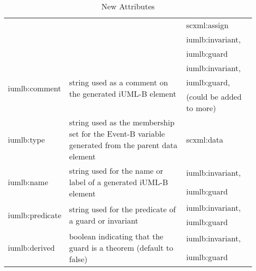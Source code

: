 \begin{table}[tbp]
{\begin{tabular}{|l|l|l|}
                                   &                                                                                                                            & scxml:assign             \\
                                   &                                                                                                                            & iumlb:invariant,         \\
                                   &                                                                                                                            & iumlb:guard              \\ \hline
\multirow{3}{*}{iumlb:comment}     & \multirow{3}{*}{string used as a comment on the generated iUML-B element}                                                  & iumlb:invariant,         \\
                                   &                                                                                                                            & iumlb:guard,             \\
                                   &                                                                                                                            & (could be added to more) \\ \hline
iumlb:type                         & string used as the membership set for the Event-B variable generated from the parent data element                          & scxml:data               \\ \hline
\multirow{2}{*}{iumlb:name}        & \multirow{2}{*}{string used for the name or label of a generated iUML-B element}                                           & iumlb:invariant,         \\
                                   &                                                                                                                            & iumlb:guard              \\ \hline
\multirow{2}{*}{iumlb:predicate}   & \multirow{2}{*}{string used for the predicate of a guard or invariant}                                                     & iumlb:invariant,         \\
                                   &                                                                                                                            & iumlb:guard              \\ \hline
\multirow{2}{*}{iumlb:derived}     & \multirow{2}{*}{boolean indicating that the guard is a theorem (default to false)}                                         & iumlb:invariant,         \\
                                   &                                                                                                                            & iumlb:guard              \\ \hline
\end{tabular}%
}
\caption{New Attributes}
\label{iumlb_attributes_table}
\end{table}


